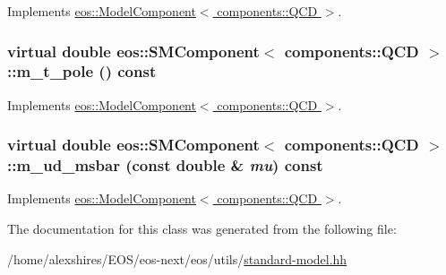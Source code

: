 Implements \hyperlink{classeos_1_1ModelComponent_3_01components_1_1QCD_01_4_af57a3d70de7579dcf92aeacff6439a40}{eos::ModelComponent$<$ components::QCD $>$}.\hypertarget{classeos_1_1SMComponent_3_01components_1_1QCD_01_4_a8c798c65f6fdf75c7f038e428134d026}{
\subsubsection[{m\_\-t\_\-pole}]{\setlength{\rightskip}{0pt plus 5cm}virtual double eos::SMComponent$<$ components::QCD $>$::m\_\-t\_\-pole () const}}
\label{classeos_1_1SMComponent_3_01components_1_1QCD_01_4_a8c798c65f6fdf75c7f038e428134d026}


Implements \hyperlink{classeos_1_1ModelComponent_3_01components_1_1QCD_01_4_a0035735c19d0b3fced44b986b09410b7}{eos::ModelComponent$<$ components::QCD $>$}.\hypertarget{classeos_1_1SMComponent_3_01components_1_1QCD_01_4_aff5afae1cb8169135ad183db75836529}{
\subsubsection[{m\_\-ud\_\-msbar}]{\setlength{\rightskip}{0pt plus 5cm}virtual double eos::SMComponent$<$ components::QCD $>$::m\_\-ud\_\-msbar (const double \& {\em mu}) const}}
\label{classeos_1_1SMComponent_3_01components_1_1QCD_01_4_aff5afae1cb8169135ad183db75836529}


Implements \hyperlink{classeos_1_1ModelComponent_3_01components_1_1QCD_01_4_a75172971f04fdac5927b0512cf77ebe2}{eos::ModelComponent$<$ components::QCD $>$}.

The documentation for this class was generated from the following file:\begin{DoxyCompactItemize}
\item 
/home/alexshires/EOS/eos-\/next/eos/utils/\hyperlink{standard-model_8hh}{standard-\/model.hh}\end{DoxyCompactItemize}
